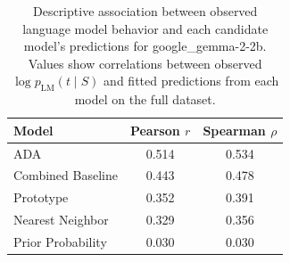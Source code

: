 \begin{table}

\caption{\label{tab:tab:model-correlations}Descriptive association between observed language model behavior and each candidate model's predictions for google_gemma-2-2b. Values show correlations between observed $\log p_{\mathrm{LM}}(t \mid S)$ and fitted predictions from each model on the full dataset.}
\centering
\begin{tabular}[t]{lcc}
\toprule
Model & Pearson $r$ & Spearman $\rho$\\
\midrule
ADA & 0.514 & 0.534\\
Combined Baseline & 0.443 & 0.478\\
Prototype & 0.352 & 0.391\\
Nearest Neighbor & 0.329 & 0.356\\
Prior Probability & 0.030 & 0.030\\
\bottomrule
\end{tabular}
\end{table}
